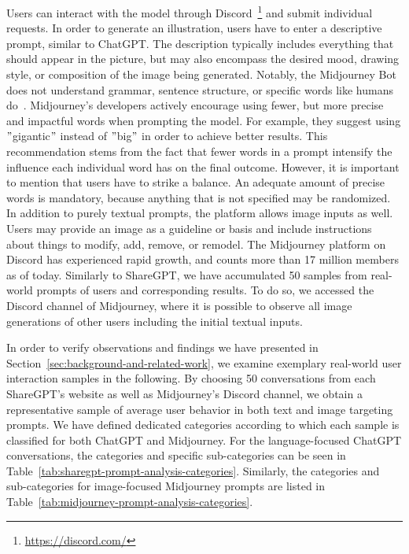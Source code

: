 Users can interact with the model through Discord~\footnote{\url{https://discord.com/}} and submit
individual requests.
In order to generate an illustration, users have to enter a descriptive prompt, similar to
ChatGPT\@.
The description typically includes everything that should appear in the picture, but may also
encompass the desired mood, drawing style, or composition of the image being generated.
Notably, the Midjourney Bot does not understand grammar, sentence structure, or specific words like
humans do~\cite{midjourney_documentation_2023}.
Midjourney's developers actively encourage using fewer, but more precise and impactful words when
prompting the model.
For example, they suggest using \("\)gigantic\("\) instead of \("\)big\("\) in order to achieve
better results.
This recommendation stems from the fact that fewer words in a prompt intensify the influence each
individual word has on the final outcome.
However, it is important to mention that users have to strike a balance.
An adequate amount of precise words is mandatory, because anything that is not specified may be
randomized.
In addition to purely textual prompts, the platform allows image inputs as well.
Users may provide an image as a guideline or basis and include instructions about things to modify,
add, remove, or remodel.
The Midjourney platform on Discord has experienced rapid growth, and counts more than 17 million
members as of today.
Similarly to ShareGPT, we have accumulated 50 samples from real-world prompts of users and
corresponding results.
To do so, we accessed the Discord channel of Midjourney, where it is possible to observe all image
generations of other users including the initial textual inputs.
\newline

In order to verify observations and findings we have presented in Section~\ref{sec:background-and-related-work},
we examine exemplary real-world user interaction samples in the following.
By choosing 50 conversations from each ShareGPT's website as well as Midjourney's Discord
channel, we obtain a representative sample of average user behavior in both text and image targeting prompts.
We have defined dedicated categories according to which each sample is classified for both
ChatGPT and Midjourney.
For the language-focused ChatGPT conversations, the categories and specific sub-categories can be
seen in Table~\ref{tab:sharegpt-prompt-analysis-categories}.
Similarly, the categories and sub-categories for image-focused Midjourney prompts are listed
in Table~\ref{tab:midjourney-prompt-analysis-categories}.


